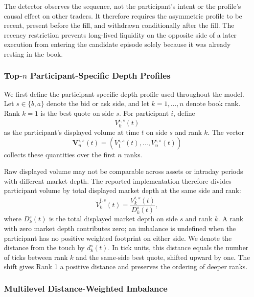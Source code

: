 \documentclass[11pt]{article}
\begin{document}
The detector observes the sequence, not the participant's intent or the profile's causal effect on other traders. It
therefore requires the asymmetric profile to be recent, present before the fill, and withdrawn conditionally after the
fill. The recency restriction prevents long-lived liquidity on the opposite side of a later execution from entering the
candidate episode solely because it was already resting in the book.

\subsubsection{\texorpdfstring{Top-$n$}{Top-n} Participant-Specific Depth Profiles}
\label{subsec:topn_depth_profiles}

We first define the participant-specific depth profile used throughout the model. Let $s \in \{b,a\}$ denote the bid or
ask side, and let $k=1,\ldots,n$ denote book rank. Rank $k=1$ is the best quote on side $s$. For participant $i$, define
\begin{equation}
    V^{i,s}_{k}(t)
\end{equation}
as the participant's displayed volume at time $t$ on side $s$ and rank $k$. The vector
\begin{equation}
    \mathbf{V}^{i,s}_{n}(t)
    = \left(V^{i,s}_{1}(t),\ldots,V^{i,s}_{n}(t)\right)
\end{equation}
collects these quantities over the first $n$ ranks.

Raw displayed volume may not be comparable across assets or intraday periods with different market depth. The reported
implementation therefore divides participant volume by total displayed market depth at the same side and rank:
\begin{equation}
    \widetilde V^{i,s}_{k}(t)
    =
    \frac{V^{i,s}_{k}(t)}{D^{s}_{k}(t)},
    \label{eq:relative_agent_depth}
\end{equation}
where $D^{s}_{k}(t)$ is the total displayed market depth on side $s$ and rank $k$. A rank with zero market depth contributes
zero; an imbalance is undefined when the participant has no positive weighted footprint on either side.
We denote the distance from the touch by $d^{s}_{k}(t)$. In tick units, this distance equals the number of ticks between
rank $k$ and the same-side best quote, shifted upward by one. The shift gives Rank 1 a positive distance and preserves the
ordering of deeper ranks.

\subsubsection{Multilevel Distance-Weighted Imbalance}
\label{subsec:multilevel_dwi}
\end{document}
